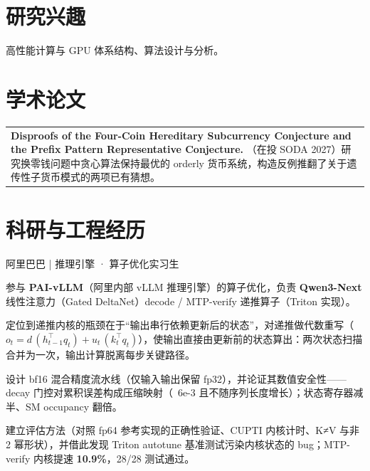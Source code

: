 

\section{研究兴趣}
高性能计算与 GPU 体系结构、算法设计与分析。


\section{学术论文}
\begin{tabularx}{\linewidth}{@{}X@{}}
\textbf{Disproofs of the Four-Coin Hereditary Subcurrency Conjecture and the Prefix Pattern Representative Conjecture.} \normalsize（在投 SODA 2027）研究换零钱问题中贪心算法保持最优的 orderly 货币系统，构造反例推翻了关于遗传性子货币模式的两项已有猜想。 \\
\end{tabularx}


\section{科研与工程经历}

\begin{joblong}{阿里巴巴 | 推理引擎 · 算子优化实习生}{\DateAlibabaCn}
\item 参与 \textbf{PAI-vLLM}（阿里内部 vLLM 推理引擎）的算子优化，负责 \textbf{Qwen3-Next} 线性注意力（Gated DeltaNet）decode / MTP-verify 递推算子（Triton 实现）。
\item 定位到递推内核的瓶颈在于“输出串行依赖更新后的状态”，对递推做代数重写（$o_t = d\,(h_{t-1}^\top q_t) + u_t\,(k_t^\top q_t)$），使输出直接由更新前的状态算出：两次状态扫描合并为一次，输出计算脱离每步关键路径。
\item 设计 bf16 混合精度流水线（仅输入输出保留 fp32），并论证其数值安全性——decay 门控对累积误差构成压缩映射（~6e-3 且不随序列长度增长）；状态寄存器减半、SM occupancy 翻倍。
\item 建立评估方法（对照 fp64 参考实现的正确性验证、CUPTI 内核计时、K≠V 与非 2 幂形状），并借此发现 Triton autotune 基准测试污染内核状态的 bug；MTP-verify 内核提速 \textbf{10.9\%}，28/28 测试通过。
\end{joblong}

